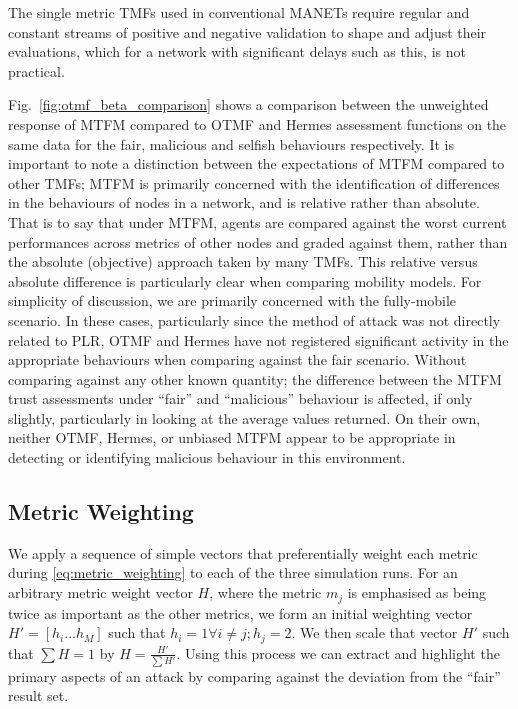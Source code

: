 \documentclass[conference]{IEEEtran}
\begin{document}
The single metric TMFs used in conventional MANETs require regular and constant streams of positive and negative validation to shape and adjust their evaluations, which for a network with significant delays such as this, is not practical.

Fig.~\ref{fig:otmf_beta_comparison} shows a comparison between the unweighted response of MTFM compared to OTMF and Hermes assessment functions on the same data for the fair, malicious and selfish behaviours respectively.
It is important to note a distinction between the expectations of MTFM compared to other TMFs; MTFM is primarily concerned with the identification of differences in the behaviours of nodes in a network, and is relative rather than absolute.
That is to say that under MTFM, agents are compared against the worst current performances across metrics of other nodes and graded against them, rather than the absolute (objective) approach taken by many TMFs.
This relative versus absolute difference is particularly clear when comparing mobility models. 
For simplicity of discussion, we are primarily concerned with the fully-mobile scenario.
In these cases, particularly since the method of attack was not directly related to PLR, OTMF and Hermes have not registered significant activity in the appropriate behaviours when comparing against the fair scenario.
Without comparing against any other known quantity; the difference between the MTFM trust assessments under ``fair'' and ``malicious'' behaviour is affected, if only slightly, particularly in looking at the average values returned.
On their own, neither OTMF, Hermes, or unbiased MTFM appear to be appropriate in detecting or identifying malicious behaviour in this environment.


\subsection{Metric Weighting}
%

We apply a sequence of simple vectors that preferentially weight each metric during \eqref{eq:metric_weighting} to each of the three simulation runs.
For an arbitrary metric weight vector $H$, where the metric $m_j$ is emphasised as being twice as important as the other metrics, we form an initial weighting vector $H'=[h_i...h_M]$ such that $h_i = 1 \forall i \ne j; h_j=2$. We then scale that vector $H'$ such that $\sum H = 1$ by $H= \frac{H'}{\sum H'}$.
Using this process we can extract and highlight the primary aspects of an attack by comparing against the deviation from the ``fair'' result set. 
\end{document}
